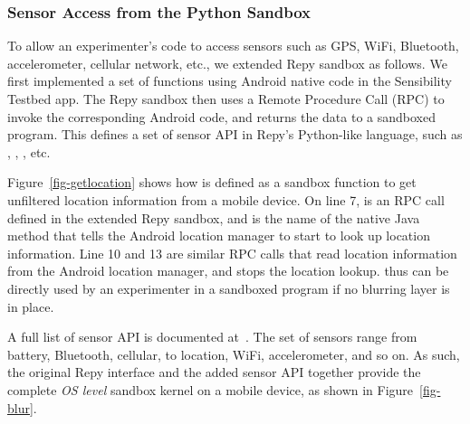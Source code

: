 \subsubsection{Sensor Access from the Python Sandbox}

To allow an experimenter's code to access sensors such as 
GPS, WiFi, Bluetooth, accelerometer, cellular network, etc., we  
extended Repy sandbox as follows. We first implemented a set of functions using
Android native code in the Sensibility Testbed app. The Repy 
sandbox then uses a Remote Procedure Call (RPC) to invoke the
corresponding Android code, and returns the data 
to a sandboxed program. This defines a set of sensor API in 
Repy's Python-like language, such as , 
, , etc. 

Figure~\ref{fig-getlocation} shows how  
is defined as a sandbox function to get unfiltered location 
information from a mobile device. 
On line 7,  is an RPC call 
defined in the extended Repy sandbox, 
and  is the name of the native Java method that tells the Android 
location manager to start to look up location information. Line 10 and 13 are similar RPC 
calls that read location information from the Android location manager, and stops the location 
lookup.  thus %
can be directly used by an experimenter in a sandboxed program if no blurring layer is in place.

A full list of sensor API is documented at~\cite{sensor-api}. The set
of sensors range from battery, Bluetooth, cellular, to location, WiFi, 
accelerometer, and so on. 
As such, the original Repy interface and the added sensor API together 
provide the complete \textit{OS level} sandbox kernel on a mobile 
device, as shown in Figure~\ref{fig-blur}.

